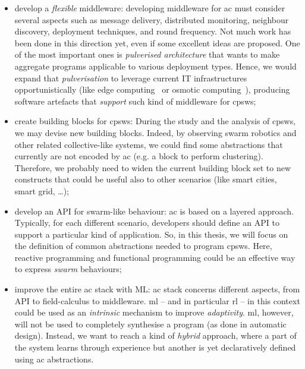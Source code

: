 \documentclass[11pt]{article}
\begin{document}
\begin{itemize}
	\item develop a \textit{flexible} middleware: 
	developing middleware for \ac{ac} must consider several aspects such as message delivery, distributed monitoring, neighbour discovery, deployment techniques, and round frequency. 
	Not much work has been done in this direction yet, even if some excellent ideas are proposed.
	One of the most important ones is \emph{pulverised architecture}\cite{DBLP:journals/fi/CasadeiPPVW20} that wants to make aggregate programs applicable to various deployment types.
	Hence, we would expand that \emph{pulverisation} to leverage current IT infrastructures opportunistically (like edge computing~\cite{DBLP:journals/computer/Satyanarayanan17} or osmotic computing~\cite{DBLP:journals/cloudcomp/VillariFDRR16}), producing software artefacts that \textit{support} such kind of middleware for \acp{cpsw};
	\item create building blocks for \acp{cpsw}: During the study and the analysis of \acp{cpsw}, we may devise new building blocks. 
	Indeed, by observing swarm robotics and other related collective-like systems, we could find some abstractions that currently are not encoded by \ac{ac} (e.g. a block to perform clustering).
	Therefore, we probably need to widen the current building block set to new constructs that could be useful also to other scenarios (like smart cities, smart grid, \dots{});
	\item develop an API for swarm-like behaviour: \ac{ac} is based on a layered approach. 
	Typically, for each different scenario, developers should define an API to support a particular kind of application. 
	So, in this thesis, we will focus on the definition of common abstractions needed to program \acp{cpsw}. 
	Here, reactive programming and functional programming could be an effective way to express \textit{swarm} behaviours; %
	\item improve the entire \ac{ac} stack with ML: \ac{ac} stack concerns different aspects, from API to field-calculus to middleware. 
	\ac{ml} -- and in particular \ac{rl} -- in this context could be used as an \emph{intrinsic} mechanism to improve \emph{adaptivity}.
	\ac{ml}, however, will not be used to completely synthesise a program (as done in automatic design). Instead, we want to reach a kind of \textit{hybrid} approach, where a part of the system learns through experience but another is yet declaratively defined using \ac{ac} abstractions.
\end{itemize}
\end{document}
